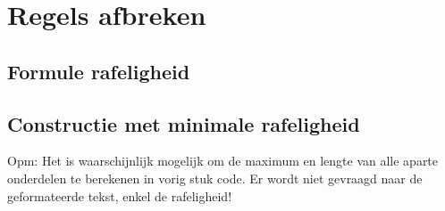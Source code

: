\hypertarget{regels-afbreken}{%
\section{Regels afbreken}\label{regels-afbreken}}

\hypertarget{formule-rafeligheid}{%
\subsection{Formule rafeligheid}\label{formule-rafeligheid}}

\begin{Shaded}
\begin{Highlighting}[]
\OperatorTok{=}\NormalTok{ [}\NormalTok{, }\NormalTok{]}
\OperatorTok{=} \NormalTok{(}
\OperatorTok{=} \OperatorTok{{-}} \OperatorTok{**} 
\end{Highlighting}
\end{Shaded}

\hypertarget{constructie-met-minimale-rafeligheid}{%
\subsection{Constructie met minimale
rafeligheid}\label{constructie-met-minimale-rafeligheid}}

\begin{Shaded}
\begin{Highlighting}[]
\OperatorTok{=} 
\OperatorTok{=} 
\OperatorTok{=} 
\OperatorTok{=}\NormalTok{ []}
\OperatorTok{=} 
\OperatorTok{\textless{}}
\OperatorTok{=}
\OperatorTok{+=} 
    \OperatorTok{\textless{}}
        \OperatorTok{!=} \NormalTok{:}
\OperatorTok{{-}=} 
\end{Highlighting}
\end{Shaded}

Opm: Het is waarschijnlijk mogelijk om de maximum en lengte van alle
aparte onderdelen te berekenen in vorig stuk code. Er wordt niet
gevraagd naar de geformateerde tekst, enkel de rafeligheid!
